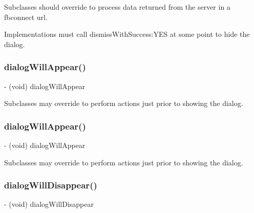 Subclasses should override to process data returned from the server in a \textquotesingle{}fbconnect\textquotesingle{} url.

Implementations must call dismiss\+With\+Success\+:Y\+ES at some point to hide the dialog. \mbox{\label{interfaceFBDialog_ad0bfcbe959e7334d076079ce3288142d}} 
\subsubsection{\texorpdfstring{dialog\+Will\+Appear()}{dialogWillAppear()}\hspace{0.1cm}{\footnotesize\ttfamily [1/2]}}
{\footnotesize\ttfamily -\/ (void) dialog\+Will\+Appear \begin{DoxyParamCaption}{ }\end{DoxyParamCaption}}

Subclasses may override to perform actions just prior to showing the dialog. \mbox{\label{interfaceFBDialog_ad0bfcbe959e7334d076079ce3288142d}} 
\subsubsection{\texorpdfstring{dialog\+Will\+Appear()}{dialogWillAppear()}\hspace{0.1cm}{\footnotesize\ttfamily [2/2]}}
{\footnotesize\ttfamily -\/ (void) dialog\+Will\+Appear \begin{DoxyParamCaption}{ }\end{DoxyParamCaption}}

Subclasses may override to perform actions just prior to showing the dialog. \mbox{\label{interfaceFBDialog_a0aaf0151353b93b543525601f9d41a83}} 
\subsubsection{\texorpdfstring{dialog\+Will\+Disappear()}{dialogWillDisappear()}\hspace{0.1cm}{\footnotesize\ttfamily [1/2]}}
{\footnotesize\ttfamily -\/ (void) dialog\+Will\+Disappear \begin{DoxyParamCaption}{ }\end{DoxyParamCaption}}

